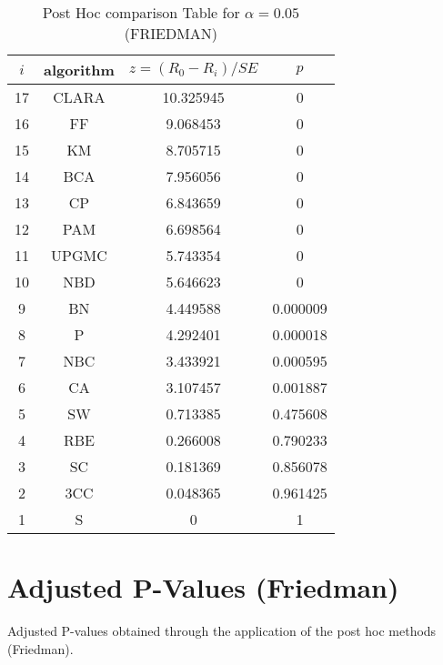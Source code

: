 \documentclass[a4paper,10pt]{article}
\begin{document}
\begin{landscape}
\begin{table}[!htp]
\centering\footnotesize
\begin{tabular}{cccc}
$i$&algorithm&$z=(R_0 - R_i)/SE$&$p$\\
\hline17&CLARA&10.325945&0\\16&FF&9.068453&0\\15&KM&8.705715&0\\14&BCA&7.956056&0\\13&CP&6.843659&0\\12&PAM&6.698564&0\\11&UPGMC&5.743354&0\\10&NBD&5.646623&0\\9&BN&4.449588&0.000009\\8&P&4.292401&0.000018\\7&NBC&3.433921&0.000595\\6&CA&3.107457&0.001887\\5&SW&0.713385&0.475608\\4&RBE&0.266008&0.790233\\3&SC&0.181369&0.856078\\2&3CC&0.048365&0.961425\\1&S&0&1\\\hline
\end{tabular}
\caption{Post Hoc comparison Table for $\alpha=0.05$ (FRIEDMAN)}
\end{table}
\newpage

\section{Adjusted P-Values (Friedman)}


Adjusted P-values obtained through the application of the post hoc methods (Friedman).


\end{landscape}
\end{document}
